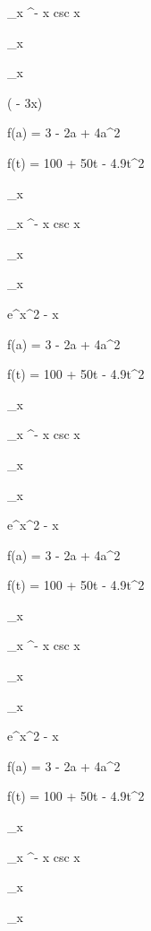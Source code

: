 \documentclass[11pt,a4paper]{article}
\begin{document}
\lim_{x \pi^-} x csc x

\lim_{x } 

\lim_{x } 

 

 ( - 3x)

f(a) = 3 - 2a + 4a^2

f(t) = 100 + 50t - 4.9t^2

\lim_{x } 

\lim_{x \pi^-} x csc x

\lim_{x } 

\lim_{x } 

 

 e^{x^2 - x}

f(a) = 3 - 2a + 4a^2

f(t) = 100 + 50t - 4.9t^2

\lim_{x } 

\lim_{x \pi^-} x csc x

\lim_{x } 

\lim_{x } 

 

 e^{x^2 - x}

f(a) = 3 - 2a + 4a^2

f(t) = 100 + 50t - 4.9t^2

\lim_{x } 

\lim_{x \pi^-} x csc x

\lim_{x } 

\lim_{x } 

 

 e^{x^2 - x}

f(a) = 3 - 2a + 4a^2

f(t) = 100 + 50t - 4.9t^2

\lim_{x } 

\lim_{x \pi^-} x csc x

\lim_{x } 

\lim_{x } 
\end{document}
